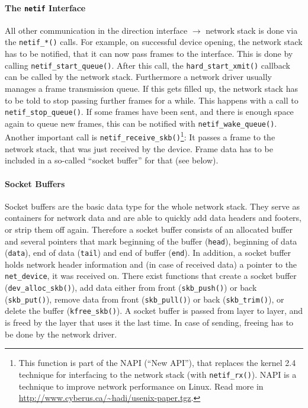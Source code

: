 \documentclass[a4paper,12pt,BCOR=6mm,bibtotoc,idxtotoc]{scrbook}
\begin{document}
\paragraph{The \lstinline+netif+ Interface} All other
communication in the direction interface $\to$ network stack is done via the
\lstinline+netif_*()+ calls. For example, on successful device opening, the
network stack has to be notified, that it can now pass frames to the
interface. This is done by calling \lstinline+netif_start_queue()+. After this
call, the \lstinline+hard_start_xmit()+ callback can be called by the network
stack. Furthermore a network driver usually manages a frame transmission
queue.  If this gets filled up, the network stack has to be told to stop
passing further frames for a while. This happens with a call to
\lstinline+netif_stop_queue()+. If some frames have been sent, and there is
enough space again to queue new frames, this can be notified with
\lstinline+netif_wake_queue()+. Another important call is
\lstinline+netif_receive_skb()+\footnote{This function is part of the NAPI
(``New API''), that replaces the kernel 2.4 technique for interfacing to the
network stack (with \lstinline+netif_rx()+). NAPI is a technique to improve
network performance on Linux. Read more in
\url{http://www.cyberus.ca/~hadi/usenix-paper.tgz}.}: It passes a frame to the
network stack, that was just received by the device. Frame data has to be
included in a so-called ``socket buffer'' for that (see below).

\paragraph{Socket Buffers} Socket buffers are the basic
data type for the whole network stack. They serve as containers for network
data and are able to quickly add data headers and footers, or strip them off
again. Therefore a socket buffer consists of an allocated buffer and several
pointers that mark beginning of the buffer (\lstinline+head+), beginning of
data (\lstinline+data+), end of data (\lstinline+tail+) and end of buffer
(\lstinline+end+). In addition, a socket buffer holds network header
information and (in case of received data) a pointer to the
\lstinline+net_device+, it was received on. There exist functions that create
a socket buffer (\lstinline+dev_alloc_skb()+), add data either from front
(\lstinline+skb_push()+) or back (\lstinline+skb_put()+), remove data from
front (\lstinline+skb_pull()+) or back (\lstinline+skb_trim()+), or delete the
buffer (\lstinline+kfree_skb()+).  A socket buffer is passed from layer to
layer, and is freed by the layer that uses it the last time. In case of
sending, freeing has to be done by the network driver.
\end{document}
